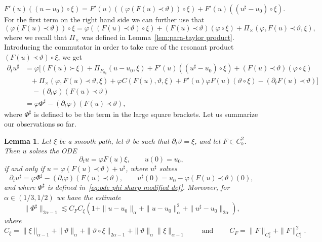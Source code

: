 \documentclass[a4paper,11pt]{article}
\newcommand{\tmop}[1]{\ensuremath{\operatorname{#1}}}
\newtheorem{lemma}[theorem]{Lemma}
\theoremstyle{remark}
\newcommand{\lpara}{\,\mathord{\prec}\,}
\newcommand{\rpara}{\,\mathord{\succ}\,}
\newcommand{\reso}{\,\mathord{\circ}\,}
\begin{document}
\[
   F' ( u )  ( ( u-u_{0} ) \reso \xi ) =F' ( u ) ( ( \varphi ( F ( u ) \lpara \vartheta ) ) \reso \xi )  +F' ( u ) ( ( u^{\sharp} -u_{0} ) \reso \xi ).
\]
For the first term on the right hand side we can further use that
\[
   ( \varphi ( F ( u ) \lpara \vartheta ) ) \reso \xi = \varphi ( ( F (u ) \lpara \vartheta ) \reso \xi ) + ( F ( u ) \lpara \vartheta ) (\varphi \reso \xi ) + \Pi_{\times} ( \varphi ,F ( u ) \lpara   \vartheta , \xi ),
\]
where we recall that $\Pi_\times$ was defined in Lemma~\ref{lem:para-taylor product}. Introducing the commutator in order to take care of the resonant product $(F(u) \lpara \vartheta) \reso \xi$, we get
\begin{align}\label{eq:ode phi sharp modified def} \nonumber
   \partial_{t} u^{\sharp} & = \varphi \bigg[ ( F ( u ) \rpara \xi ) + \Pi_{F_{u_{0}}} ( u-u_{0} , \xi ) +F' ( u ) ( ( u^{\sharp} -u_{0} ) \reso \xi ) + ( F ( u ) \lpara \vartheta ) ( \varphi \reso \xi ) \\ \nonumber
   &\hspace{9pt} + \Pi_{\times} ( \varphi ,F ( u ) \lpara \vartheta , \xi ) + \varphi C ( F ( u ) , \vartheta , \xi ) +F' ( u ) \varphi F ( u ) ( \vartheta \reso \xi ) - ( \partial_{t} F ( u ) \lpara \vartheta ) \bigg] \\ \nonumber
   &\quad - ( \partial_{t} \varphi )  ( F ( u ) \lpara \vartheta ) \\
   & = \varphi \Phi^{\sharp} - (\partial_{t} \varphi )  ( F ( u ) \lpara \vartheta ),
\end{align}
where $\Phi^\sharp$ is defined to be the term in the large square brackets. Let us summarize our observations so far.

\begin{lemma}
  Let $\xi$ be a smooth path, let $\vartheta$ be such that $\partial_{t}  \vartheta = \xi$, and let $F \in C^{2}_{b}$. Then
  $u$ solves the ODE
  \[
     \partial_{t} u= \varphi F ( u ) \xi, \qquad u ( 0 ) =u_{0},
  \]
  if and only if $u= \varphi ( F (u ) \lpara \vartheta ) +u^{\sharp}$, where $u^{\sharp}$ solves
  \[
     \partial_{t} u^{\sharp} = \varphi \Phi^{\sharp} - ( \partial_{t} \varphi )  ( F ( u ) \lpara \vartheta ), \qquad u^{\sharp} ( 0 ) =u_{0} - \varphi ( F ( u )\lpara \vartheta ) ( 0 ),
  \]
  and where $\Phi^{\sharp}$ is defined in~\eqref{eq:ode phi sharp modified def}. Moreover, for $\alpha \in ( 1/3,1/2 )$ we have the estimate
  \[
     \| \Phi^{\sharp} \|_{2 \alpha -1} \lesssim C_{F} C_{\xi} ( 1+ \| u-u_{0}  \|_{\alpha} + \| u-u_{0} \|^{2}_{\alpha} + \| u^{\sharp} -u_{0} \|_{2 \alpha} ),
  \]
  where
  \[
     C_{\xi} = \| \xi \|_{\alpha -1} + \| \vartheta \|_{\alpha} + \| \vartheta \reso   \xi \|_{2 \alpha -1} + \| \vartheta \|_{\alpha} \| \xi \|_{\alpha -1} \qquad \tmop{and} \qquad C_{F} = \| F \|_{C^{2}_{b}} + \| F \|_{C^{2}_{b}}^{2} .
  \]   
\end{lemma}
\end{document}

